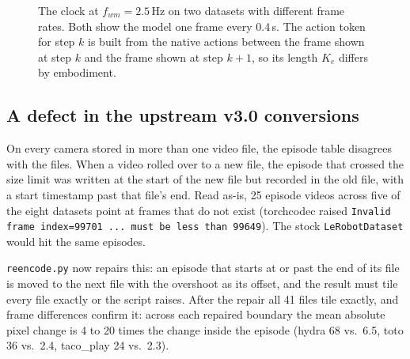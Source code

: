 \documentclass[10pt]{article}
\newcommand{\code}[1]{\texttt{\small #1}}
\begin{document}
\begin{figure}[H]
\centering
{}
\caption{The clock at $f_{wm}=2.5$\,Hz on two datasets with different frame rates. Both show
the model one frame every 0.4\,s. The action token for step $k$ is built from the native
actions between the frame shown at step $k$ and the frame shown at step $k{+}1$, so its
length $K_e$ differs by embodiment.}
\label{fig:clock}
\end{figure}

\subsection{A defect in the upstream v3.0 conversions}
On every camera stored in more than one video file, the episode table disagrees with the
files. When a video rolled over to a new file, the episode that crossed the size limit was
written at the start of the new file but recorded in the old file, with a start timestamp
past that file's end. Read as-is, 25 episode videos across five of the eight datasets point
at frames that do not exist (torchcodec raised \code{Invalid frame index=99701 ... must be
less than 99649}). The stock \code{LeRobotDataset} would hit the same episodes.

\code{reencode.py} now repairs this: an episode that starts at or past the end of its file is
moved to the next file with the overshoot as its offset, and the result must tile every file
exactly or the script raises. After the repair all 41 files tile exactly, and frame
differences confirm it: across each repaired boundary the mean absolute pixel change is 4 to
20 times the change inside the episode (hydra 68 vs.\ 6.5, toto 36 vs.\ 2.4, taco\_play 24
vs.\ 2.3).
\end{document}
